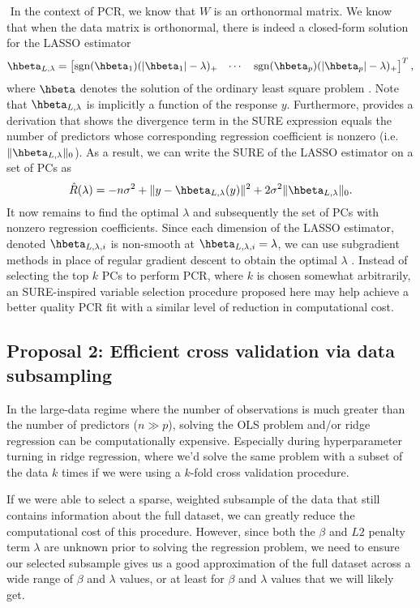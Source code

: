$ $\newline
In the context of PCR, we know that $W$ is an orthonormal matrix. We know that when the data matrix is orthonormal, there is indeed a closed-form solution for the LASSO estimator
\[
\hbeta_{L,\lambda} = \begin{bmatrix} \sgn(\hbeta_1)(|\hbeta_1| - \lambda)_+ & \cdots & \sgn(\hbeta_p)(|\hbeta_p| - \lambda)_+ \end{bmatrix}^T,
\]
where $\hbeta$ denotes the solution of the ordinary least square problem \citep{gauraha2018introduction}. Note that $\hbeta_{L,\lambda}$ is implicitly a function of the response $y$. Furthermore, \citet{tibshirani2015stein} provides a derivation that shows the divergence term in the SURE expression equals the number of predictors whose corresponding regression coefficient is nonzero (i.e. $\|\hbeta_{L,\lambda}\|_0$). As a result, we can write the SURE of the LASSO estimator on a set of PCs as 
\[
\hat{R}(\lambda) = -n\sigma^2 + \| y - \hbeta_{L,\lambda}(y) \|^2 + 2\sigma^2\|\hbeta_{L,\lambda}\|_0.
\]
It now remains to find the optimal $\lambda$ and subsequently the set of PCs with nonzero regression coefficients. Since each dimension of the LASSO estimator, denoted $\hbeta_{L,\lambda,i}$ is non-smooth at $\hbeta_{L,\lambda,i} = \lambda$, we can use subgradient methods in place of regular gradient descent to obtain the optimal $\lambda$ \citep{shor2012minimization}. Instead of selecting the top $k$ PCs to perform PCR, where $k$ is chosen somewhat arbitrarily, an SURE-inspired variable selection procedure proposed here may help achieve a better quality PCR fit with a similar level of reduction in computational cost.

\pagebreak

\subsection{Proposal 2: Efficient cross validation via data subsampling} %
In the large-data regime where the number of observations is much greater than the number of predictors ($n\gg p$), solving the OLS problem and/or ridge regression can be computationally expensive. Especially during hyperparameter turning in ridge regression, where we'd solve the same problem with a subset of the data $k$ times if we were using a $k$-fold cross validation procedure. 

If we were able to select a sparse, weighted subsample of the data that still contains information about the full dataset, we can greatly reduce the computational cost of this procedure. However, since both the $\beta$ and $L2$ penalty term $\lambda$ are unknown prior to solving the regression problem, we need to ensure our selected subsample gives us a good approximation of the full dataset across a wide range of $\beta$ and $\lambda$ values, or at least for $\beta$ and $\lambda$ values that we will likely get.

